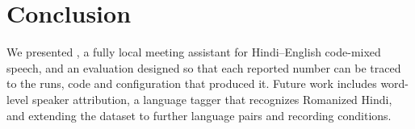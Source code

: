 \section{Conclusion}
\label{sec:conclusion}

We presented \system{}, a fully local meeting assistant for Hindi--English
code-mixed speech, and an evaluation designed so that each reported number can
be traced to the runs, code and configuration that produced it.
 Future work includes word-level speaker attribution, a language tagger
that recognizes Romanized Hindi, and extending the dataset to further
language pairs and recording conditions.
